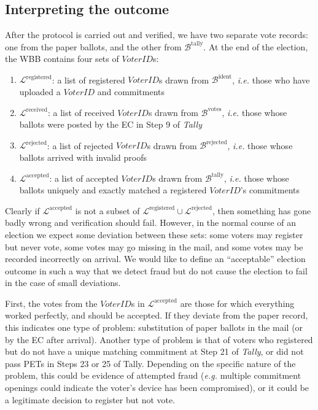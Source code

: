 \documentclass[12pt,a4paper]{article}
\theoremstyle{definition}
\newcommand{\VoterID}{\mathit{VoterID}}
\newcommand{\ie}{\textit{i.e. }}
\newcommand{\eg}{\textit{e.g. }}
\begin{document}
\subsection{Interpreting the outcome}
After the protocol is carried out and verified, we have two separate vote records: one from the paper ballots, and the other from $\mathcal{B}^{\text{tally}}$. At the end of the election, the WBB contains four sets of $\VoterID$s:
\begin{enumerate}
    \item $\mathcal{L}^{\text{registered}}$: a list of registered $\VoterID$s drawn from $\mathcal{B}^{\text{ident}}$, \ie those who have uploaded a $\VoterID$ and commitments

    \item $\mathcal{L}^{\text{received}}$: a list of received $\VoterID$s drawn from $\mathcal{B}^{\text{votes}}$, \ie those whose ballots were posted by the EC in Step 9 of \textit{Tally}

    \item $\mathcal{L}^{\text{rejected}}$: a list of rejected $\VoterID$s drawn from $\mathcal{B}^{\text{rejected}}$, \ie those whose ballots arrived with invalid proofs

    \item  $\mathcal{L}^{\text{accepted}}$: a list of accepted $\VoterID$s drawn from $\mathcal{B}^{\text{tally}}$, \ie those whose ballots uniquely and exactly matched a registered $\VoterID$'s commitments
\end{enumerate}

Clearly if $\mathcal{L}^{\text{accepted}}$ is not a subset of $\mathcal{L}^{\text{registered}} \cup \mathcal{L}^{\text{rejected}}$, then something has gone badly wrong and verification should fail. However, in the normal course of an election we expect some deviation between these sets: some voters may register but never vote, some votes may go missing in the mail, and some votes may be recorded incorrectly on arrival. We would like to define an ``acceptable'' election outcome in such a way that we detect fraud but do not cause the election to fail in the case of small deviations.

First, the votes from the $\VoterID$s in $\mathcal{L}^{\text{accepted}}$ are those for which everything worked perfectly, and should be accepted. If they deviate from the paper record, this indicates one type of problem: substitution of paper ballots in the mail (or by the EC after arrival). Another type of problem is that of voters who registered but do not have a unique matching commitment at Step 21 of \textit{Tally}, or did not pass PETs in Steps 23 or 25 of Tally. Depending on the specific nature of the problem, this could be evidence of attempted fraud (\eg multiple commitment openings could indicate the voter's device has been compromised), or it could be a legitimate decision to register but not vote.
\end{document}
